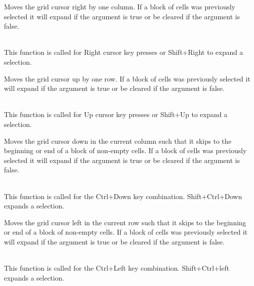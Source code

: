 \label{wxgridmovecursorright}


Moves the grid cursor right by one column. If a block of cells was previously selected it
will expand if the argument is true or be cleared if the argument is false.

\\
This function is called for Right cursor key presses or Shift+Right to expand a selection.

\label{wxgridmovecursorup}


Moves the grid cursor up by one row. If a block of cells was previously selected it
will expand if the argument is true or be cleared if the argument is false.

\\
This function is called for Up cursor key presses or Shift+Up to expand a selection.

\label{wxgridmovecursordownblock}


Moves the grid cursor down in the current column such that it skips to the beginning or
end of a block of non-empty cells. If a block of cells was previously selected it
will expand if the argument is true or be cleared if the argument is false.

\\
This function is called for the Ctrl+Down key combination. Shift+Ctrl+Down expands a selection.

\label{wxgridmovecursorleftblock}


Moves the grid cursor left in the current row such that it skips to the beginning or
end of a block of non-empty cells. If a block of cells was previously selected it
will expand if the argument is true or be cleared if the argument is false.

\\
This function is called for the Ctrl+Left key combination. Shift+Ctrl+left expands a selection.

